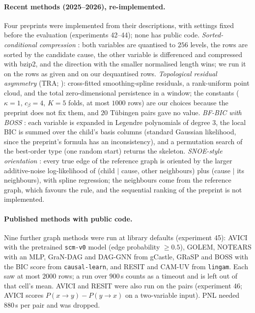 \paragraph{Recent methods (2025--2026), re-implemented.} Four preprints were implemented from their
descriptions, with settings fixed before the evaluation (experiments 42--44); none has public code.
\emph{Sorted-conditional compression} \citep{stienstra2026oneruler}: both variables are quantised to
$256$ levels, the rows are sorted by the candidate cause, the other variable is differenced and compressed
with bzip2, and the direction with the smaller normalised length wins; we run it on the rows as given
and on our dequantised rows. \emph{Topological residual asymmetry} (TRA; \citealt{elbouchattaoui2026tra}):
cross-fitted smoothing-spline residuals, a rank-uniform point cloud, and the total zero-dimensional
persistence in a window; the constants ($\kappa=1$, $c_\beta=4$, $K=5$ folds, at most $1000$ rows) are
our choices because the preprint does not fix them, and $20$ Tübingen pairs gave no value.
\emph{BF-BIC with BOSS} \citep{ramsey2025bfbic}: each variable is expanded in Legendre polynomials of
degree $3$, the local BIC is summed over the child's basis columns (standard Gaussian likelihood, since
the preprint's formula has an inconsistency), and a permutation search of the best-order type (one random start)
returns the skeleton. \emph{SNOE-style orientation} \citep{huang2025snoe}: every true edge of the
reference graph is oriented by the larger additive-noise log-likelihood of (child $\mid$ cause, other
neighbours) plus (cause $\mid$ its neighbours), with spline regression; the neighbours come from the
reference graph, which favours the rule, and the sequential ranking of the preprint is not implemented.

\paragraph{Published methods with public code.} Nine further graph methods were run at library defaults
(experiment 45): AVICI with the pretrained \texttt{scm-v0} model (edge probability $\ge 0.5$), GOLEM,
NOTEARS with an MLP, GraN-DAG and DAG-GNN from gCastle, GRaSP and BOSS with the BIC score from
\texttt{causal-learn}, and RESIT and CAM-UV from \texttt{lingam}. Each saw at most $2000$ rows; a run
over $900$\,s counts as a timeout and is left out of that cell's mean. AVICI and RESIT were also run on the
pairs (experiment 46; AVICI scores $P(x\to y)-P(y\to x)$ on a two-variable input). PNL needed $880$\,s per
pair and was dropped.

